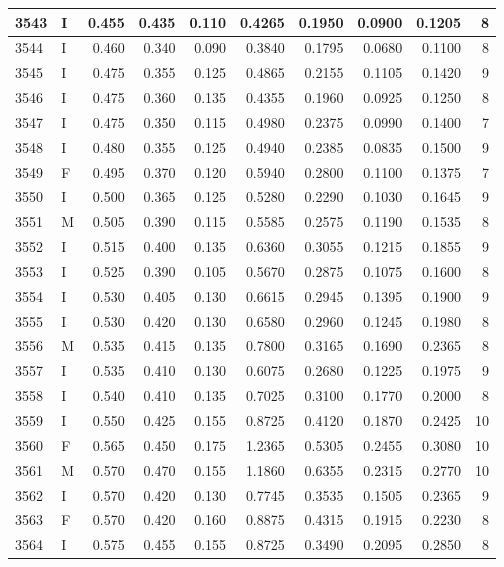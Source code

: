 \documentclass[9pt,twocolumn,twoside,]{pnas-new}
\begin{document}
\begin{tabular}{l|l|r|r|r|r|r|r|r|r}
\hline
3543 & I & 0.455 & 0.435 & 0.110 & 0.4265 & 0.1950 & 0.0900 & 0.1205 & 8\\
\hline
3544 & I & 0.460 & 0.340 & 0.090 & 0.3840 & 0.1795 & 0.0680 & 0.1100 & 8\\
\hline
3545 & I & 0.475 & 0.355 & 0.125 & 0.4865 & 0.2155 & 0.1105 & 0.1420 & 9\\
\hline
3546 & I & 0.475 & 0.360 & 0.135 & 0.4355 & 0.1960 & 0.0925 & 0.1250 & 8\\
\hline
3547 & I & 0.475 & 0.350 & 0.115 & 0.4980 & 0.2375 & 0.0990 & 0.1400 & 7\\
\hline
3548 & I & 0.480 & 0.355 & 0.125 & 0.4940 & 0.2385 & 0.0835 & 0.1500 & 9\\
\hline
3549 & F & 0.495 & 0.370 & 0.120 & 0.5940 & 0.2800 & 0.1100 & 0.1375 & 7\\
\hline
3550 & I & 0.500 & 0.365 & 0.125 & 0.5280 & 0.2290 & 0.1030 & 0.1645 & 9\\
\hline
3551 & M & 0.505 & 0.390 & 0.115 & 0.5585 & 0.2575 & 0.1190 & 0.1535 & 8\\
\hline
3552 & I & 0.515 & 0.400 & 0.135 & 0.6360 & 0.3055 & 0.1215 & 0.1855 & 9\\
\hline
3553 & I & 0.525 & 0.390 & 0.105 & 0.5670 & 0.2875 & 0.1075 & 0.1600 & 8\\
\hline
3554 & I & 0.530 & 0.405 & 0.130 & 0.6615 & 0.2945 & 0.1395 & 0.1900 & 9\\
\hline
3555 & I & 0.530 & 0.420 & 0.130 & 0.6580 & 0.2960 & 0.1245 & 0.1980 & 8\\
\hline
3556 & M & 0.535 & 0.415 & 0.135 & 0.7800 & 0.3165 & 0.1690 & 0.2365 & 8\\
\hline
3557 & I & 0.535 & 0.410 & 0.130 & 0.6075 & 0.2680 & 0.1225 & 0.1975 & 9\\
\hline
3558 & I & 0.540 & 0.410 & 0.135 & 0.7025 & 0.3100 & 0.1770 & 0.2000 & 8\\
\hline
3559 & I & 0.550 & 0.425 & 0.155 & 0.8725 & 0.4120 & 0.1870 & 0.2425 & 10\\
\hline
3560 & F & 0.565 & 0.450 & 0.175 & 1.2365 & 0.5305 & 0.2455 & 0.3080 & 10\\
\hline
3561 & M & 0.570 & 0.470 & 0.155 & 1.1860 & 0.6355 & 0.2315 & 0.2770 & 10\\
\hline
3562 & I & 0.570 & 0.420 & 0.130 & 0.7745 & 0.3535 & 0.1505 & 0.2365 & 9\\
\hline
3563 & F & 0.570 & 0.420 & 0.160 & 0.8875 & 0.4315 & 0.1915 & 0.2230 & 8\\
\hline
3564 & I & 0.575 & 0.455 & 0.155 & 0.8725 & 0.3490 & 0.2095 & 0.2850 & 8\\

\end{tabular}
\end{document}
